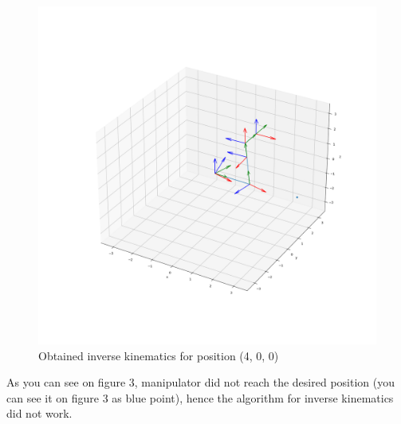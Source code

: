 \begin{figure}[!ht]
    \centering
    \includegraphics[width=\linewidth]{inverse_example.png}
    \caption{Obtained inverse kinematics for position (4, 0, 0)}
    \label{fig:figure3}
\end{figure}

As you can see on figure 3, manipulator did not reach the desired position (you can see it on figure 3 as blue point), hence the algorithm for inverse kinematics did not work.